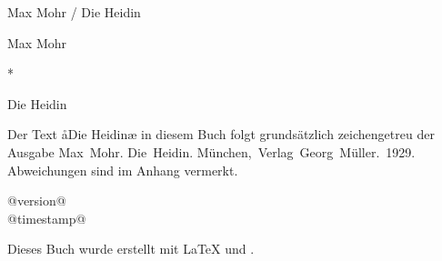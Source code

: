 

\begin{titlepage}
\pagestyle{empty}

\begin{center}

Max Mohr / Die Heidin

\cleardoublepage

\null

\vspace{4ex}

\huge
Max Mohr

\vspace{3ex}
*
\vspace{2ex}

\Huge
Die Heidin

\vspace{4ex}


\clearpage

\null

\vfill

\normalfont\small

\begin{center}
Der Text \aa{}Die Heidin\ae{} in diesem Buch folgt
grundsätzlich zeichengetreu der Ausgabe\dopp{} \mbox{Max Mohr.} \mbox{Die Heidin.}
\mbox{München, Verlag Georg Müller. 1929.}
Abweichungen sind im Anhang vermerkt.
\end{center}

\begin{center}
@version@\\
@timestamp@
\end{center}

Dieses Buch wurde erstellt mit \LaTeX{} und \KOMAScript{}.

\end{center}

\end{titlepage}
